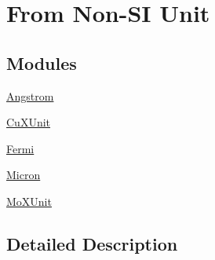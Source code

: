 \hypertarget{group___e_g_x_math-_conversions-_length_conversions-_non-_s_i}{}\section{From Non-\/\+SI Unit}
\label{group___e_g_x_math-_conversions-_length_conversions-_non-_s_i}
\subsection*{Modules}
\begin{DoxyCompactItemize}
\item 
\mbox{\hyperlink{group___e_g_x_math-_conversions-_length_conversions-_non-_s_i-_angstrom}{Angstrom}}
\item 
\mbox{\hyperlink{group___e_g_x_math-_conversions-_length_conversions-_non-_s_i-_cu_x_unit}{Cu\+X\+Unit}}
\item 
\mbox{\hyperlink{group___e_g_x_math-_conversions-_length_conversions-_non-_s_i-_fermi}{Fermi}}
\item 
\mbox{\hyperlink{group___e_g_x_math-_conversions-_length_conversions-_non-_s_i-_micron}{Micron}}
\item 
\mbox{\hyperlink{group___e_g_x_math-_conversions-_length_conversions-_non-_s_i-_mo_x_unit}{Mo\+X\+Unit}}
\end{DoxyCompactItemize}


\subsection{Detailed Description}
